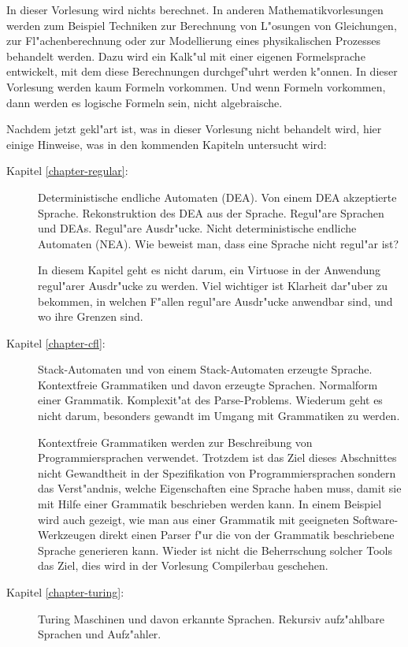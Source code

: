 In dieser Vorlesung wird nichts berechnet.
In anderen
Mathematikvorlesungen werden zum Beispiel Techniken zur Berechnung
von L"osungen von
Gleichungen, zur Fl"achenberechnung oder zur Modellierung eines 
physikalischen Prozesses behandelt werden.
Dazu wird ein Kalk"ul mit einer eigenen Formelsprache entwickelt,
mit dem diese Berechnungen durchgef"uhrt werden k"onnen.
In dieser Vorlesung werden kaum Formeln vorkommen. 
Und wenn Formeln vorkommen, dann werden es logische Formeln sein,
nicht algebraische.

Nachdem jetzt gekl"art ist, was in dieser Vorlesung nicht behandelt
wird, hier einige Hinweise, was in den kommenden Kapiteln untersucht
wird:
\begin{description}
\item[Kapitel \ref{chapter-regular}:] Deterministische endliche Automaten (DEA). Von einem
DEA akzeptierte Sprache. Rekonstruktion des DEA aus der Sprache.
Regul"are Sprachen und DEAs. Regul"are Ausdr"ucke. Nicht deterministische
endliche Automaten (NEA). Wie beweist man, dass eine Sprache nicht regul"ar
ist?

In diesem Kapitel geht es nicht darum, ein Virtuose in der
Anwendung regul"arer Ausdr"ucke zu werden. Viel wichtiger ist Klarheit dar"uber
zu bekommen, in welchen F"allen regul"are Ausdr"ucke anwendbar sind,
und wo ihre Grenzen sind.

\item[Kapitel \ref{chapter-cfl}:] Stack-Automaten und von einem Stack-Automaten
erzeugte Sprache. Kontextfreie Grammatiken und davon erzeugte Sprachen. 
Normalform einer Grammatik. Komplexit"at des Parse-Problems.
Wiederum geht es nicht darum, besonders gewandt im Umgang mit Grammatiken
zu werden.

Kontextfreie Grammatiken werden zur Beschreibung von Programmiersprachen verwendet.
Trotzdem ist das Ziel dieses Abschnittes nicht Gewandtheit in der Spezifikation
von Programmiersprachen sondern das Verst"andnis, welche Eigenschaften eine
Sprache haben muss, damit sie mit Hilfe einer Grammatik beschrieben werden kann.
In einem Beispiel wird auch gezeigt, wie man aus einer Grammatik mit geeigneten
Software-Werkzeugen direkt einen Parser f"ur die von der Grammatik beschriebene
Sprache generieren kann. Wieder ist nicht die Beherrschung solcher Tools das
Ziel, dies wird in der Vorlesung Compilerbau geschehen.

\item[Kapitel \ref{chapter-turing}:] Turing Maschinen und davon erkannte Sprachen. 
Rekursiv aufz"ahlbare Sprachen und Aufz"ahler.


\end{description}

